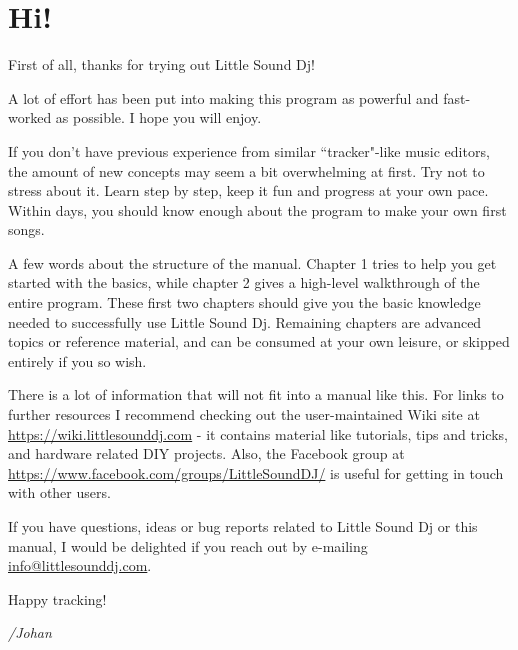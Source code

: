 \chapter*{Hi!}
First of all, thanks for trying out Little Sound Dj!

A lot of effort has been put into making this program as powerful and fast-worked as possible. I hope you will enjoy.

If you don't have previous experience from similar ``tracker"-like music editors, the amount of new concepts may seem a bit overwhelming at first.  Try not to stress about it. Learn step by step, keep it fun and progress at your own pace. Within days, you should know enough about the program to make your own first songs.

A few words about the structure of the manual. Chapter 1 tries to help you get started with the basics, while chapter 2 gives a high-level walkthrough of the entire program. These first two chapters should give you the basic knowledge needed to successfully use Little Sound Dj. Remaining chapters are advanced topics or reference material, and can be consumed at your own leisure, or skipped entirely if you so wish.

There is a lot of information that will not fit into a manual like this. For links to further resources I recommend checking out the user-maintained Wiki site at \url{https://wiki.littlesounddj.com} - it contains material like tutorials, tips and tricks, and hardware related DIY projects. Also, the Facebook group at \url{https://www.facebook.com/groups/LittleSoundDJ/} is useful for getting in touch
with other users.

If you have questions, ideas or bug reports related to Little Sound Dj or this manual, I would be delighted if you reach out by e-mailing \href{mailto:info@littlesounddj.com}{info@littlesounddj.com}.

Happy tracking!

\textit{/Johan}

